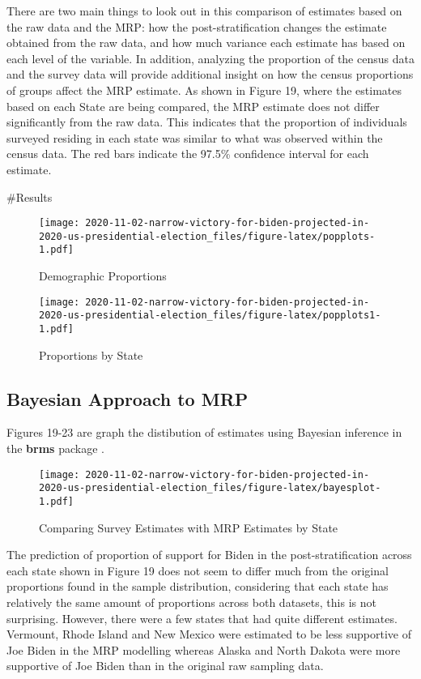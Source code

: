 \documentclass[
]{article}
\begin{document}
There are two main things to look out in this comparison of estimates based on the raw data and the MRP: how the post-stratification changes the estimate obtained from the raw data, and how much variance each estimate has based on each level of the variable. In addition, analyzing the proportion of the census data and the survey data will provide additional insight on how the census proportions of groups affect the MRP estimate. As shown in Figure 19, where the estimates based on each State are being compared, the MRP estimate does not differ significantly from the raw data. This indicates that the proportion of individuals surveyed residing in each state was similar to what was observed within the census data. The red bars indicate the 97.5\% confidence interval for each estimate.

\#Results

\begin{figure}
\centering
\texttt{[image: 2020-11-02-narrow-victory-for-biden-projected-in-2020-us-presidential-election\_files/figure-latex/popplots-1.pdf]}
\caption{\label{fig:popplots}Demographic Proportions}
\end{figure}

\begin{figure}
\centering
\texttt{[image: 2020-11-02-narrow-victory-for-biden-projected-in-2020-us-presidential-election\_files/figure-latex/popplots1-1.pdf]}
\caption{\label{fig:popplots1}Proportions by State}
\end{figure}

\hypertarget{bayesian-approach-to-mrp}{%
\subsection{Bayesian Approach to MRP}\label{bayesian-approach-to-mrp}}

Figures 19-23 are graph the distibution of estimates using Bayesian inference in the \textbf{brms} package \citep{citebrms}.

\begin{figure}
\centering
\texttt{[image: 2020-11-02-narrow-victory-for-biden-projected-in-2020-us-presidential-election\_files/figure-latex/bayesplot-1.pdf]}
\caption{\label{fig:bayesplot}Comparing Survey Estimates with MRP Estimates by State}
\end{figure}

The prediction of proportion of support for Biden in the post-stratification across each state shown in Figure 19 does not seem to differ much from the original proportions found in the sample distribution, considering that each state has relatively the same amount of proportions across both datasets, this is not surprising. However, there were a few states that had quite different estimates. Vermount, Rhode Island and New Mexico were estimated to be less supportive of Joe Biden in the MRP modelling whereas Alaska and North Dakota were more supportive of Joe Biden than in the original raw sampling data.
\end{document}
